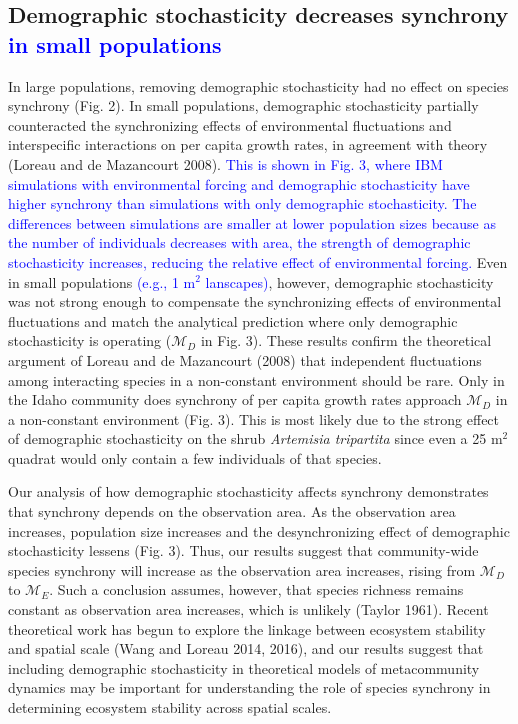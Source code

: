 \documentclass[11pt,]{article}
\begin{document}
\subsection{Demographic stochasticity decreases synchrony \textcolor{blue}{in small populations}}

In large populations, removing demographic stochasticity had no effect
on species synchrony (Fig. 2). In small populations, demographic
stochasticity partially counteracted the synchronizing effects of
environmental fluctuations and interspecific interactions on per capita
growth rates, in agreement with theory (Loreau and {{de Mazancourt}}
2008).
\textcolor{blue}{This is shown in Fig. 3, where IBM simulations with environmental forcing and demographic stochasticity have higher synchrony than simulations with only demographic stochasticity.
The differences between simulations are smaller at lower population sizes because as the number of individuals decreases with area, the strength of demographic stochasticity increases, reducing the relative effect of environmental forcing.}
Even in small populations
\textcolor{blue}{(e.g., 1 $\text{m}^2$ lanscapes)}, however, demographic
stochasticity was not strong enough to compensate the synchronizing
effects of environmental fluctuations and match the analytical
prediction where only demographic stochasticity is operating
(\(\mathcal{M}_D\) in Fig. 3). These results confirm the theoretical
argument of Loreau and {{de Mazancourt}} (2008) that independent
fluctuations among interacting species in a non-constant environment
should be rare. Only in the Idaho community does synchrony of per capita
growth rates approach \(\mathcal{M}_D\) in a non-constant environment
(Fig. 3). This is most likely due to the strong effect of demographic
stochasticity on the shrub \emph{Artemisia tripartita} since even a 25
\(\text{m}^2\) quadrat would only contain a few individuals of that
species.

Our analysis of how demographic stochasticity affects synchrony
demonstrates that synchrony depends on the observation area. As the
observation area increases, population size increases and the
desynchronizing effect of demographic stochasticity lessens (Fig. 3).
Thus, our results suggest that community-wide species synchrony will
increase as the observation area increases, rising from
\(\mathcal{M}_D\) to \(\mathcal{M}_E\). Such a conclusion assumes,
however, that species richness remains constant as observation area
increases, which is unlikely (Taylor 1961). Recent theoretical work has
begun to explore the linkage between ecosystem stability and spatial
scale (Wang and Loreau 2014, 2016), and our results suggest that
including demographic stochasticity in theoretical models of
metacommunity dynamics may be important for understanding the role of
species synchrony in determining ecosystem stability across spatial
scales.
\end{document}
